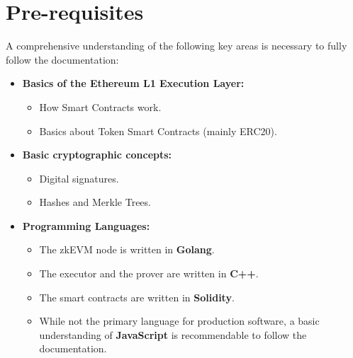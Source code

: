 



\section{Pre-requisites}

A comprehensive understanding of the following key areas is necessary to fully follow the documentation:

\begin{itemize}

\item \textbf{Basics of the Ethereum L1 Execution Layer:}

\begin{itemize}

\item How Smart Contracts work.

\item Basics about Token Smart Contracts (mainly ERC20).

\end{itemize}

\item \textbf{Basic cryptographic concepts:}

\begin{itemize}

\item Digital signatures.

\item Hashes and Merkle Trees.

\end{itemize}

\item \textbf{Programming Languages:}

\begin{itemize}

\item The zkEVM node is written in \textbf{Golang}.

\item The executor and the prover are written in \textbf{C++}.

\item The smart contracts are written in \textbf{Solidity}.

\item While not the primary language for production software, a basic understanding of \textbf{JavaScript} is recommendable to follow the documentation.
\end{itemize}
\end{itemize}
